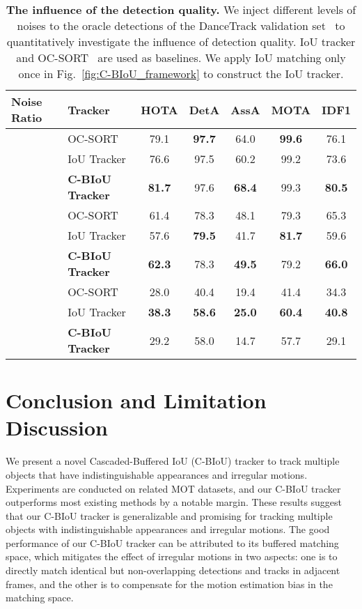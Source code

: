 \documentclass[journal]{IEEEtran}
\begin{document}
\begin{table}[t]
\caption{\textbf{The influence of the detection quality.} We inject different levels of noises to the oracle detections of the DanceTrack validation set~\cite{sun2022dancetrack} to quantitatively investigate the influence of detection quality. IoU tracker and OC-SORT~\cite{cao2022observation} are used as baselines. We apply IoU matching only once in Fig.~\ref{fig:C-BIoU_framework} to construct the IoU tracker. }
   \centering
   \setlength{\tabcolsep}{.8pt}
   \footnotesize
   \begin{tabular}{ llccccc}
   \toprule
   Noise Ratio & Tracker & HOTA & DetA & AssA & MOTA & IDF1\\
   \midrule
   \multirow{3}{*}{ } 
   &OC-SORT~\cite{cao2022observation}  & 79.1& \textbf{97.7} &  64.0 & \textbf{99.6}  & 76.1\\
   & IoU Tracker & 76.6 & 97.5 & 60.2 & 99.2 & 73.6\\
   & \textbf{C-BIoU Tracker}  &  \textbf{81.7} &97.6 & \textbf{68.4} & 99.3 & \textbf{80.5}\\
   \hline
   \multirow{3}{*}{ } 
   &OC-SORT~\cite{cao2022observation}  &61.4 &78.3 &48.1 &79.3 &65.3\\
   &IoU Tracker     & 57.6 & \textbf{79.5} & 41.7 & \textbf{81.7} & 59.6\\
   &\textbf{C-BIoU Tracker}  & \textbf{62.3} & 78.3 & \textbf{49.5} & 79.2 & \textbf{66.0}\\
   \hline
   \multirow{3}{*}{ } 
   &OC-SORT~\cite{cao2022observation}  &28.0 &40.4 &19.4 &41.4 &34.3\\
   & IoU Tracker      & \textbf{38.3} & \textbf{58.6} & \textbf{25.0} & \textbf{60.4} & \textbf{40.8}\\
   & \textbf{C-BIoU Tracker}   & 29.2 & 58.0 & 14.7 & 57.7 & 29.1\\
   \bottomrule
   \end{tabular}
   \label{table:noise_study}
\end{table}





\section{Conclusion and Limitation Discussion}
\vspace{-1mm}
We present a novel Cascaded-Buffered IoU (C-BIoU) tracker to track multiple objects that have indistinguishable appearances and irregular motions. Experiments are conducted on related MOT datasets, and our C-BIoU tracker outperforms most existing methods by a notable margin. These results suggest that our C-BIoU tracker is generalizable and promising for tracking multiple objects with indistinguishable appearances and irregular motions.  The good performance of our C-BIoU tracker can be attributed to its buffered matching space, which mitigates the effect of irregular motions in two aspects: one is to directly match identical but non-overlapping detections and tracks in adjacent frames, and the other is to compensate for the motion estimation bias in the matching space.
\end{document}
